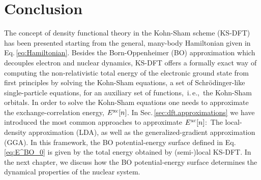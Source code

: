\section{Conclusion}
The concept of density functional theory in the Kohn-Sham scheme (KS-DFT) has been presented starting from the general, many-body Hamiltonian given in Eq.\,\eqref{eq:Hamiltonian}. Besides the Born-Oppenheimer (BO) approximation which decouples electron and nuclear dynamics, KS-DFT offers a formally exact way of computing the non-relativistic total energy of the electronic ground state from first principles by solving the Kohn-Sham equations, a set of Schr\"odinger-like single-particle equations, for an auxiliary set of functions,~i.\,e.,~the Kohn-Sham orbitals. In order to solve the Kohn-Sham equations one needs to approximate the exchange-correlation energy, $E^{\rm xc} [n]$. In Sec.\,\ref{sec:dft.approximations} we have introduced the most common approaches to approximate $E^{\rm xc} [n]$:~The local-density approximation (LDA), as well as the generalized-gradient approximation (GGA). In this framework, the BO potential-energy surface defined in Eq.\,\eqref{eq:E^BO_0} is given by the total energy obtained by \mbox{(semi-)}local KS-DFT.
In the next chapter, we discuss how the BO potential-energy surface determines the dynamical properties of the nuclear system.
